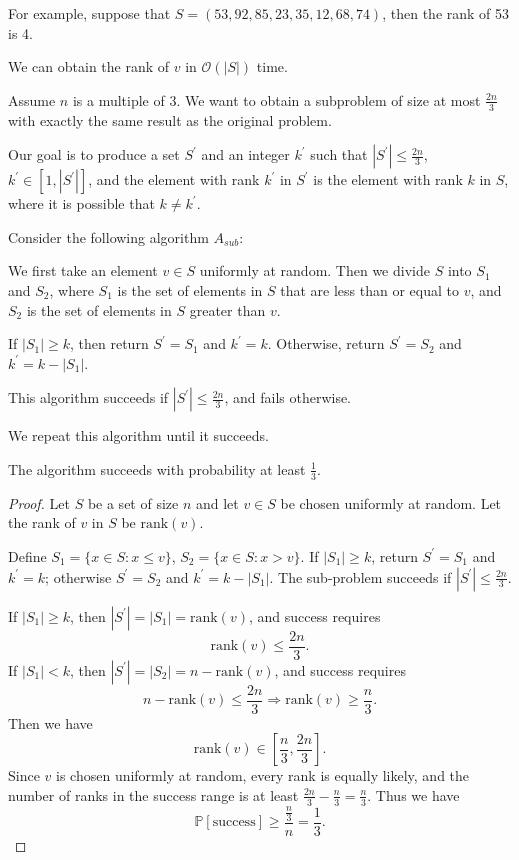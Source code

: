 For example, suppose that \(S = (53, 92, 85, 23, 35, 12, 68, 74)\), then the rank of 53 is 4. 

We can obtain the rank of \(v\) in \(\mathcal{O}(|S|)\) time. 

\begin{eg}
  Assume \(n\) is a multiple of 3. We want to obtain a subproblem of size at most \(\frac{2n}{3}\) with exactly the same result as the original problem. 

  Our goal is to produce a set \(S^{\prime}\) and an integer \(k^{\prime}\) such that \(|S^{\prime}| \leq \frac{2n}{3}\), \(k^{\prime} \in [1, |S^{\prime}|]\), and the element with rank \(k^{\prime}\) in \(S^{\prime}\) is the element with rank \(k\) in \(S\), where it is possible that \(k \neq k^{\prime}\). 

  Consider the following algorithm \(A_{sub}\): 

  We first take an element \(v \in S\) uniformly at random. Then we divide \(S\) into \(S_1\) and \(S_2\), where \(S_1\) is the set of elements in \(S\) that are less than or equal to \(v\), and \(S_2\) is the set of elements in \(S\) greater than \(v\). 

  If \(|S_1| \geq k\), then return \(S^{\prime} = S_1\) and \(k^{\prime} = k\). Otherwise, return \(S^{\prime} = S_2\) and \(k^{\prime} = k - |S_1|\). 

  This algorithm succeeds if \(|S^{\prime}| \leq \frac{2n}{3}\), and fails otherwise. 

  We repeat this algorithm until it succeeds. 

  \begin{lemma}
    The algorithm succeeds with probability at least \(\frac{1}{3}\). 
  \end{lemma}

  \begin{proof}
    Let \(S\) be a set of size \(n\) and let \(v \in S\) be chosen uniformly at random. Let the rank of \(v\) in \(S\) be \(\text{rank}(v)\). 

    Define \(S_1 = \{x \in S : x \leq v\}\), \(S_2 = \{x \in S : x > v\}\). If \(|S_1| \geq k\), return \(S^{\prime} = S_1\) and \(k^{\prime} = k\); otherwise \(S^{\prime} = S_2\) and \(k^{\prime} = k - |S_1|\). The sub-problem succeeds if \(|S^{\prime}| \leq \frac{2n}{3}\). 

    If \(|S_1| \geq k\), then \(|S^{\prime}| = |S_1| = \text{rank}(v)\), and success requires
    \[
      \text{rank}(v) \leq \dfrac{2n}{3}. 
    \]
    If \(|S_1| < k\), then \(|S^{\prime}| = |S_2| = n - \text{rank}(v)\), and success requires
    \[
      n - \text{rank}(v) \leq \dfrac{2n}{3} \Longrightarrow \text{rank}(v) \geq \dfrac{n}{3}.
    \]
    Then we have 
    \[
      \text{rank}(v) \in \left[\dfrac{n}{3}, \dfrac{2n}{3}\right].
    \]
    Since \(v\) is chosen uniformly at random, every rank is equally likely, and the number of ranks in the success range is at least \(\frac{2n}{3} - \frac{n}{3} = \frac{n}{3}\). Thus we have 
    \[
      \mathbb{P}[\text{success}] \geq \dfrac{\frac{n}{3}}{n} = \dfrac{1}{3}.
    \]
  \end{proof}


\end{eg}
